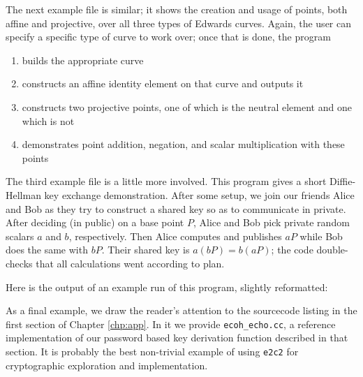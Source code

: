 
The next example file is similar; it shows the creation and usage of points,
    both affine and projective, over all three types of Edwards curves.
Again, the user can specify a specific type of curve to work over; once that is
    done, the program
\begin{enumerate}
\item builds the appropriate curve
\item constructs an affine identity element on that curve and outputs it
\item constructs two projective points, one of which is the neutral element and
    one which is not
\item demonstrates point addition, negation, and scalar multiplication with
    these points
\end{enumerate}


The third example file is a little more involved.
This program gives a short Diffie-Hellman key exchange demonstration.
After some setup, we join our friends Alice and Bob as they try to construct a
    shared key so as to communicate in private.
After deciding (in public) on a base point $P$, Alice and Bob pick private
    random scalars $a$ and $b$, respectively.
Then Alice computes and publishes $aP$ while Bob does the same with $bP$.
Their shared key is $a(bP) = b(aP)$; the code double-checks that all
    calculations went according to plan.

Here is the output of an example run of this program, slightly reformatted:



As a final example, we draw the reader's attention to the sourcecode listing in
    the first section of Chapter \ref{chp:app}.
In it we provide \texttt{ecoh\_echo.cc}, a reference implementation of our
    password based key derivation function described in that section.
It is probably the best non-trivial example of using \texttt{e2c2} for
    cryptographic exploration and implementation.
